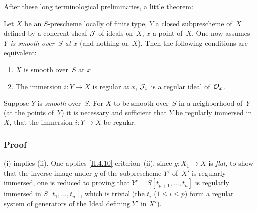 After these long terminological preliminaries, a little
theorem:

\begin{theorem}
\label{II.4.15}
Let $X$ be an $S$-prescheme locally of finite type, $Y$ a
closed subprescheme of~$X$ defined by a coherent sheaf
$\cal{J}$ of ideals on~$X$, $x$ a point of~$X$. One
now assumes \emph{$Y$ is smooth over~$S$ at $x$} (and nothing on~$X$). Then the following conditions are equivalent:
\begin{enumerate}
\item[(i)] $X$ is smooth over~$S$ at $x$
\item[(ii)] The immersion $i\colon Y \to X$ is regular at
$x$, \ie $\cal{J}_x$ is a regular ideal of~$\cal{O}_x$.
\end{enumerate}
\end{theorem}

\begin{corollary}
\label{II.4.16}
Suppose $Y$ is \emph{smooth} over~$S$. For $X$ to be smooth over~$S$
in a neighborhood of~$Y$ (\ie at the points of~$Y$) it is necessary and sufficient
that $Y$ be regularly immersed in $X$, \ie that
the immersion $i \colon Y \to X$ be regular.
\end{corollary}

\subsubsection*{Proof}
(i) implies (ii). One applies \ref{II.4.10} criterion~(ii), since
$g\colon X_1 \to X$ is \emph{flat}, to show that the inverse image
under $g$ of the subprescheme $Y'$ of~$X'$ is
regularly immersed, one is reduced to proving that
$Y'=S[t_{p+1},\dots, t_n]$ is regularly immersed in
$S[t_1,\dots,t_n]$, which is trivial (the $t_i$ ($1 \leq i \leq
p$) form a regular system of generators of
the Ideal defining $Y'$ in $X'$).

